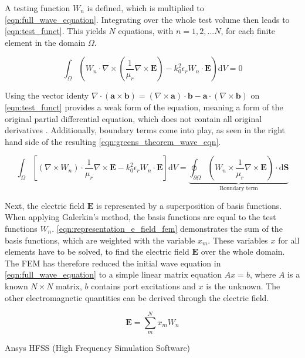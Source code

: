 A testing function $W_n$ is defined, which is multiplied to \autoref{eqn:full_wave_equation}. Integrating over the whole test volume then leads to \autoref{eqn:test_funct}. This yields $N$ equations, with $n=1,2,...N$, for each finite element in the domain $\Omega$.

\begin{equation}
    \int_\Omega\left( W_n\cdot\nabla \times\left( \frac{1}{\mu_r}\nabla\times\mathbf{E} \right)-k_0^2\epsilon_rW_n\cdot\mathbf{E} \right)\mathrm{d}V=0
    \label{eqn:test_funct}
\end{equation}

Using the vector identy $\nabla\cdot\left(\mathbf{a}\times\mathbf{b}\right)=\left(\nabla\times\mathbf{a}\right)\cdot\mathbf{b}-\mathbf{a}\cdot\left(\nabla\times\mathbf{b}\right)$  on \autoref{eqn:test_funct} provides a weak form of the equation, meaning a form of the original partial differential equation, which does not contain all original derivatives \cite{Cendes_Lee_1988,Cendes_1991}. Additionally, boundary terms come into play, as seen in the right hand side of the resulting \autoref{eqn:greens_theorem_wave_eqn}. 

\begin{equation}
    \int_\Omega \left[ \left(\nabla \times W_n \right)\cdot \frac{1}{\mu_r}\nabla\times \mathbf{E}-k_0^2\epsilon_rW_n\cdot\mathbf{E}\right]\mathrm{d}V=\underbrace{\oint_{\partial\Omega}\left( W_n\times \frac{1}{\mu_r}\nabla\times\mathbf{E}\right)\cdot\mathrm{d}\mathbf{S}}_{\text{Boundary term}}
    \label{eqn:greens_theorem_wave_eqn}
\end{equation}

Next, the electric field $\mathbf{E}$ is represented by a superposition of basis functions. When applying Galerkin's method, the basis functions are equal to the test functions $W_n$. \autoref{eqn:representation_e_field_fem} demonstrates the sum of the basis functions, which are weighted with the variable $x_m$. These variables $x$ for all elements have to be solved, to find the electric field $\mathbf{E}$ over the whole domain. The FEM has therefore reduced the initial wave equation in \autoref{eqn:full_wave_equation} to a simple linear matrix equation $Ax=b$, where $A$ is a known $N\times N$ matrix, $b$ contains port excitations and $x$ is the unknown. The other electromagnetic quantities can be derived through the electric field.

\begin{equation}
    \mathbf{E}=\sum^N_mx_mW_n
    \label{eqn:representation_e_field_fem}
\end{equation}



Ansys HFSS (High Frequency Simulation Software) %



